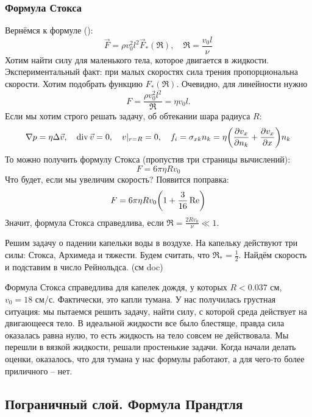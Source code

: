 \subsubsection{Формула Стокса}
Вернёмся к формуле ():
\begin{equation}
     \vec{F} = \rho v_0^2 l^2 \vec{F}_* (\Re), \quad \Re=\frac{v_0 l}{\nu}
\end{equation}
Хотим найти силу для маленького тела, которое двигается в жидкости.
Экспериментальный факт: при малых скоростях сила трения пропорциональна скорости. Хотим подобрать функцию $F_*(\Re)$. Очевидно, для линейности нужно
\begin{equation}
    F=\frac{\rho v_0^2 l^2}{\Re}=\eta v_0 l.
\end{equation}
Если мы хотим строго решать задачу, об обтекании шара радиуса $R$:
\begin{equation}
    \nabla p = \eta \Delta \vec{v}, \quad
    \operatorname{div} \vec{v} = 0, \quad v|_{r=R}=0, \quad
    f_i=\sigma_{xk} n_k = \eta \qty(\pdv{v_x}{n_k}+\pdv{v_x}{x})n_k
\end{equation}
То можно получить формулу Стокса (пропустив три страницы вычислений):
\begin{equation}
    F=6\pi \eta R v_0
\end{equation}
Что будет, если мы увеличим скорость? Появится поправка:
\begin{equation}
    F=6\pi \eta R v_0 \qty(1+\frac{3}{16}\Re)
\end{equation}
Значит, формула Стокса справедлива, если $\Re=\frac{2Rv_0}{\nu} \ll 1$.

Решим задачу о падении капельки воды в воздухе. На капельку действуют три силы: Стокса, Архимеда и тяжести. Будем считать, что $\Re_*=\frac{1}{2}$.
Найдём скорость и подставим в число Рейнольдса. (см doc)

Формула Стокса справедлива для капелек дождя, у которых $R<0.037$ см, $v_0 = 18 $ см/с. 
Фактически, это капли тумана.
У нас получилась грустная ситуация: мы пытаемся решить задачу, найти силу, с которой среда действует на двигающееся тело. 
В идеальной жидкости все было блестяще, правда сила оказалась равна нулю, то есть жидкость на тело совсем не действовала.
Мы перешли в вязкой жидкости, решали простенькие задачи. Когда начали делать оценки, оказалось, что для тумана у нас формулы работают, а для чего-то более приличного -- нет.

\subsection{Пограничный слой. Формула Прандтля}


